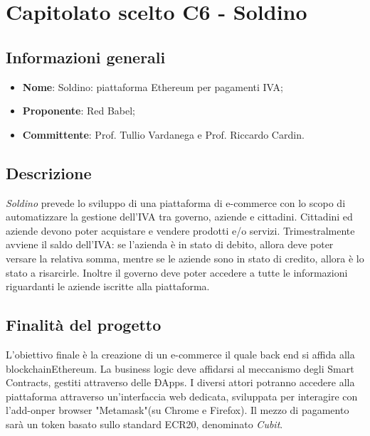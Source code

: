\section{Capitolato scelto C6 - Soldino}
\subsection{Informazioni generali}
% 
\begin{itemize}
\item \textbf{Nome}: Soldino: piattaforma Ethereum per pagamenti IVA;
\item \textbf{Proponente}: Red Babel;
\item \textbf{Committente}: Prof. Tullio Vardanega e Prof. Riccardo Cardin.
\end{itemize}

\subsection{Descrizione}
\textit{Soldino} prevede lo sviluppo di una piattaforma di e-commerce con lo scopo di automatizzare la gestione dell'IVA tra governo, aziende e cittadini. Cittadini ed aziende devono poter acquistare e vendere prodotti e/o servizi. Trimestralmente avviene il saldo dell'IVA: se l'azienda è in stato di debito, allora deve poter versare la relativa somma, mentre se le aziende sono in stato di credito, allora è lo stato a risarcirle. Inoltre il governo deve poter accedere a tutte le informazioni riguardanti le aziende iscritte alla piattaforma.

\subsection{Finalità del progetto}
L’obiettivo finale è la creazione di un e-commerce il quale back end si affida alla blockchain\glosp Ethereum\glo. La business logic deve affidarsi al meccanismo degli Smart Contracts\glo, gestiti attraverso delle ÐApps\glo. I diversi
attori potranno accedere alla piattaforma attraverso un’interfaccia web dedicata, sviluppata per interagire con l'add-on\glosp per browser "Metamask"\glosp (su Chrome e Firefox). Il mezzo di pagamento sarà un token basato sullo standard ECR20\glo, denominato \textit{Cubit}\glo.



